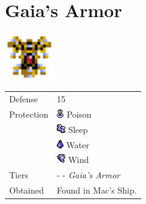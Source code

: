 \section{Gaia's Armor}
\label{armor:gaias_armor}

\includegraphics[height=2cm,keepaspectratio]{./resources/armors/gaiasarmor}

\begin{longtable}{ l p{9cm} }
	Defense
	& 15
\\ %
	Protection
	& \includegraphics[height=1em,keepaspectratio]{./resources/effects/poison}
	Poison \\
	& \includegraphics[height=1em,keepaspectratio]{./resources/effects/sleep}
	Sleep \\
	& \includegraphics[height=1em,keepaspectratio]{./resources/effects/water}
	Water \\
	& \includegraphics[height=1em,keepaspectratio]{./resources/effects/wind}
	Wind
\\ %
	Tiers
	& \nameref{armor:steel_armor} - \nameref{armor:noble_armor} - \textit{Gaia's Armor}
\\ %
	Obtained
	& Found in Mac’s Ship.
\end{longtable}

